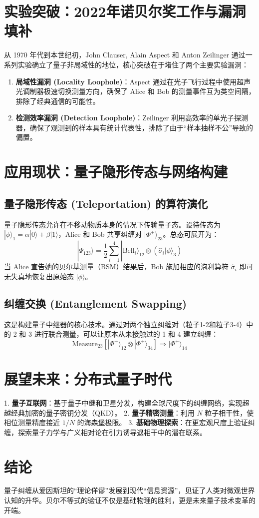 \documentclass[11pt,a4paper]{article}
\begin{document}
\section{实验突破：2022年诺贝尔奖工作与漏洞填补}


从 1970 年代到本世纪初，John Clauser, Alain Aspect 和 Anton Zeilinger 通过一系列实验确立了量子非局域性的地位，核心突破在于堵住了两个主要实验漏洞：
\begin{enumerate}
    \item \textbf{局域性漏洞 (Locality Loophole)}：Aspect 通过在光子飞行过程中使用超声光调制器极速切换测量方向，确保了 Alice 和 Bob 的测量事件互为类空间隔，排除了经典通信的可能性。
    \item \textbf{检测效率漏洞 (Detection Loophole)}：Zeilinger 利用高效率的单光子探测器，确保了观测到的样本具有统计代表性，排除了由于“样本抽样不公”导致的偏置。
\end{enumerate}

\section{应用现状：量子隐形传态与网络构建}

\subsection{量子隐形传态 (Teleportation) 的算符演化}
量子隐形传态允许在不移动物质本身的情况下传输量子态。设待传态为 $|\phi\rangle_1 = \alpha|0\rangle + \beta|1\rangle$，Alice 和 Bob 共享纠缠对 $|\Phi^+\rangle_{23}$。总态可展开为：
\begin{equation}
    |\Psi_{123}\rangle = \frac{1}{2} \sum_{i=1}^4 |\text{Bell}_i\rangle_{12} \otimes (\hat{\sigma}_i |\phi\rangle_3)
\end{equation}
当 Alice 宣告她的贝尔基测量（BSM）结果后，Bob 施加相应的泡利算符 $\hat{\sigma}_i$ 即可无失真地恢复出原始态 $|\phi\rangle$。



\subsection{纠缠交换 (Entanglement Swapping)}
这是构建量子中继器的核心技术。通过对两个独立纠缠对（粒子1-2和粒子3-4）中的 2 和 3 进行联合测量，可以让原本从未接触过的 1 和 4 建立纠缠：
\begin{equation}
    \text{Measure}_{23} \left[ |\Phi^+\rangle_{12} \otimes |\Phi^+\rangle_{34} \right] \Rightarrow |\Phi^+\rangle_{14}
\end{equation}

\section{展望未来：分布式量子时代}
1. \textbf{量子互联网}：基于量子中继和卫星分发，构建全球尺度下的纠缠网络，实现超越经典加密的量子密钥分发（QKD）。
2. \textbf{量子精密测量}：利用 $N$ 粒子相干性，使相位测量精度接近 $1/N$ 的海森堡极限。
3. \textbf{基础物理探索}：在更宏观尺度上验证纠缠，探索量子力学与广义相对论在引力诱导退相干中的潜在联系。

\section{结论}
量子纠缠从爱因斯坦的“理论佯谬”发展到现代“信息资源”，见证了人类对微观世界认知的升华。贝尔不等式的验证不仅是基础物理的胜利，更是未来量子技术变革的开端。
\end{document}
